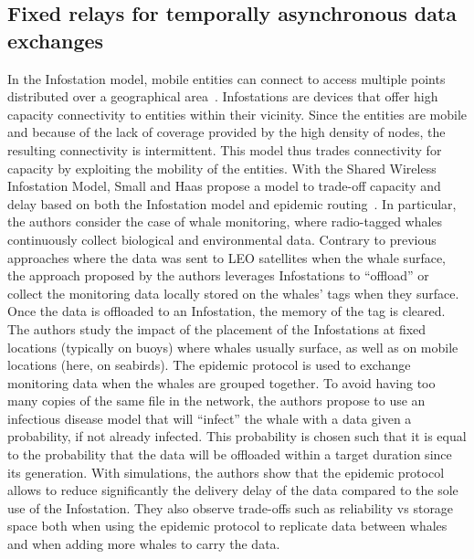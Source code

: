 \subsection{Fixed relays for temporally asynchronous data exchanges}
\label{sec:fixed-relays}

In the Infostation model, mobile entities can connect to access multiple points distributed over a geographical area~\cite{goodman1997infostations}. Infostations are devices that offer high capacity connectivity to entities within their vicinity. Since the entities are mobile and because of the lack of coverage provided by the high density of nodes, the resulting connectivity is intermittent. This model thus trades connectivity for capacity by exploiting the mobility of the entities. With the Shared Wireless Infostation Model, Small and Haas propose a model to trade-off capacity and delay based on both the Infostation model and epidemic routing~\cite{small2003shared}. In particular, the authors consider the case of whale monitoring, where radio-tagged whales continuously collect biological and environmental data. Contrary to previous approaches where the data was sent to LEO satellites when the whale surface, the approach proposed by the authors leverages Infostations to ``offload'' or collect the monitoring data locally stored on the whales' tags when they surface. Once the data is offloaded to an Infostation, the memory of the tag is cleared. The authors study the impact of the placement of the Infostations at fixed locations (typically on buoys) where whales usually surface, as well as on mobile locations (here, on  seabirds). The epidemic protocol is used to exchange monitoring data when the whales are grouped together. To avoid having too many copies of the same file in the network, the authors propose to use an infectious disease model that will ``infect'' the whale with a data given a probability, if not already infected. This probability is chosen such that it is equal to the probability that the data will be offloaded within a target duration since its generation. With simulations, the authors show that the epidemic protocol allows to reduce significantly the delivery delay of the data compared to the sole use of the Infostation. They also observe trade-offs such as reliability vs storage space both when using the epidemic protocol to replicate data between whales and when adding more whales to carry the data.


